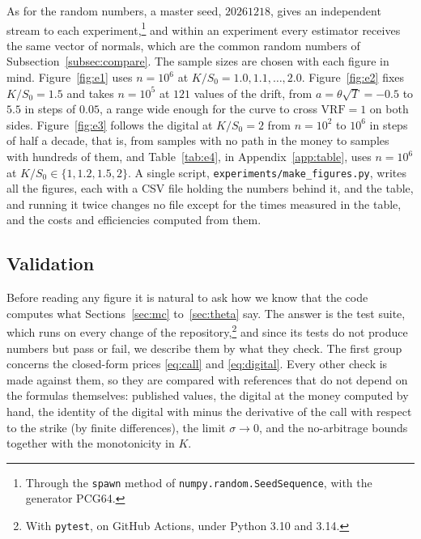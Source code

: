 \documentclass[11pt,a4paper]{article}
\theoremstyle{plain}
\theoremstyle{definition}
\theoremstyle{remark}
\newcommand{\1}{\mathbf{1}}
\newcommand{\VRF}{\mathrm{VRF}}
\begin{document}
As for the random numbers, a master seed, $20261218$, gives an independent stream to each experiment,\footnote{Through the \texttt{spawn} method of \texttt{numpy.random.SeedSequence}, with the generator PCG64.} and within an experiment every estimator receives the same vector of normals, which are the common random numbers of Subsection~\ref{subsec:compare}. The sample sizes are chosen with each figure in mind. Figure~\ref{fig:e1} uses $n = 10^6$ at $K/S_0 = 1.0, 1.1, \dots, 2.0$. Figure~\ref{fig:e2} fixes $K/S_0 = 1.5$ and takes $n = 10^5$ at $121$ values of the drift, from $a = \theta\sqrt T = -0.5$ to $5.5$ in steps of $0.05$, a range wide enough for the curve to cross $\VRF = 1$ on both sides. Figure~\ref{fig:e3} follows the digital at $K/S_0 = 2$ from $n = 10^2$ to $10^6$ in steps of half a decade, that is, from samples with no path in the money to samples with hundreds of them, and Table~\ref{tab:e4}, in Appendix~\ref{app:table}, uses $n = 10^6$ at $K/S_0 \in \{1, 1.2, 1.5, 2\}$. A single script, \texttt{experiments/make\_figures.py}, writes all the figures, each with a CSV file holding the numbers behind it, and the table, and running it twice changes no file except for the times measured in the table, and the costs and efficiencies computed from them.

\subsection{Validation}
\label{subsec:validation}

Before reading any figure it is natural to ask how we know that the code computes what Sections~\ref{sec:mc} to~\ref{sec:theta} say. The answer is the test suite, which runs on every change of the repository,\footnote{With \texttt{pytest}, on GitHub Actions, under Python 3.10 and 3.14.} and since its tests do not produce numbers but pass or fail, we describe them by what they check. The first group concerns the closed-form prices \eqref{eq:call} and \eqref{eq:digital}. Every other check is made against them, so they are compared with references that do not depend on the formulas themselves: published values, the digital at the money computed by hand, the identity of the digital with minus the derivative of the call with respect to the strike (by finite differences), the limit $\sigma \to 0$, and the no-arbitrage bounds together with the monotonicity in $K$.
\end{document}
